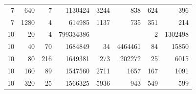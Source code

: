 \begin{table}[p]
\begin{minipage}[c]{0.49\textwidth}
\begin{tabular}{|rr|rr|rr|rr|}
\num{7} &  \num{640} &   \num{7} &     \num{1130424} & \num{3244} &         \num{838} & \num{624} &        \num{396} \\
\num{7} & \num{1280} &   \num{4} &      \num{614985} & \num{1137} &         \num{735} & \num{351} &        \num{214} \\
\hline
\num{10} &   \num{20} &   \num{4} & \num{799334386} &            &               &   \num{2} & \num{1302498} \\
\num{10} &   \num{40} &  \num{70} &   \num{1684849} &   \num{34} & \num{4464461} &  \num{84} &   \num{15850} \\
\num{10} &   \num{80} & \num{216} &   \num{1649381} &  \num{273} &  \num{202272} &  \num{25} &    \num{6015} \\
\num{10} &  \num{160} &  \num{89} &   \num{1547560} & \num{2711} &    \num{1657} & \num{167} &    \num{1091} \\
\num{10} &  \num{320} &  \num{25} &   \num{1566325} & \num{5936} &     \num{943} & \num{549} &     \num{599} \\

\end{tabular}
\end{minipage}
\end{table}
